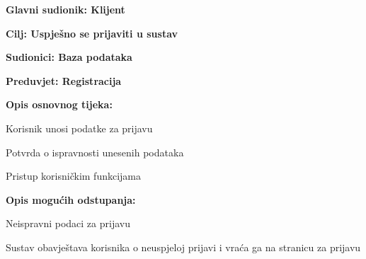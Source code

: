 					
					\noindent {}
					\begin{packed_item}
	
						\item \textbf{Glavni sudionik: Klijent}
						\item  \textbf{Cilj: Uspješno se prijaviti u sustav}
						\item  \textbf{Sudionici: Baza podataka}
						\item  \textbf{Preduvjet: Registracija } 
						\item  \textbf{Opis osnovnog tijeka:}
						
						\item[] \begin{packed_enum}
	
							\item Korisnik unosi podatke za prijavu
					
							\item Potvrda o ispravnosti unesenih podataka
							\item Pristup korisničkim funkcijama
						\end{packed_enum}
						
						\item  \textbf{Opis mogućih odstupanja:}
						
						\item[] \begin{packed_item}
	
							\item[1.a] Neispravni podaci za prijavu
							\item[] \begin{packed_enum}
								
								\item Sustav obavještava korisnika o neuspjeloj prijavi i vraća ga na stranicu za prijavu		
							\end{packed_enum}
						\end{packed_item}
					\end{packed_item}
					
